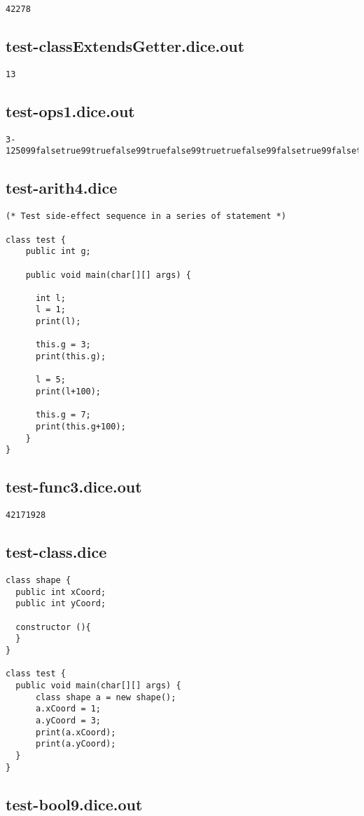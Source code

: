 \begin{verbatim}
42278
\end{verbatim}\pagebreak\subsection{test-classExtendsGetter.dice.out}
\begin{verbatim}
13
\end{verbatim}\pagebreak\subsection{test-ops1.dice.out}
\begin{verbatim}
3-125099falsetrue99truefalse99truefalse99truetruefalse99falsetrue99falsetruetrue
\end{verbatim}\pagebreak\subsection{test-arith4.dice}
\begin{verbatim}
(* Test side-effect sequence in a series of statement *)

class test {
	public int g;

	public void main(char[][] args) {

	  int l;
	  l = 1;
	  print(l);
	  
	  this.g = 3;
	  print(this.g);
	  
	  l = 5;
	  print(l+100);
	  
	  this.g = 7;
	  print(this.g+100);
	}
}
\end{verbatim}\pagebreak\subsection{test-func3.dice.out}
\begin{verbatim}
42171928
\end{verbatim}\pagebreak\subsection{test-class.dice}
\begin{verbatim}
class shape {
  public int xCoord;
  public int yCoord;

  constructor (){
  }
}

class test {
  public void main(char[][] args) {
      class shape a = new shape(); 
      a.xCoord = 1;
      a.yCoord = 3;
      print(a.xCoord);
      print(a.yCoord);
  }
}
\end{verbatim}\pagebreak\subsection{test-bool9.dice.out}
